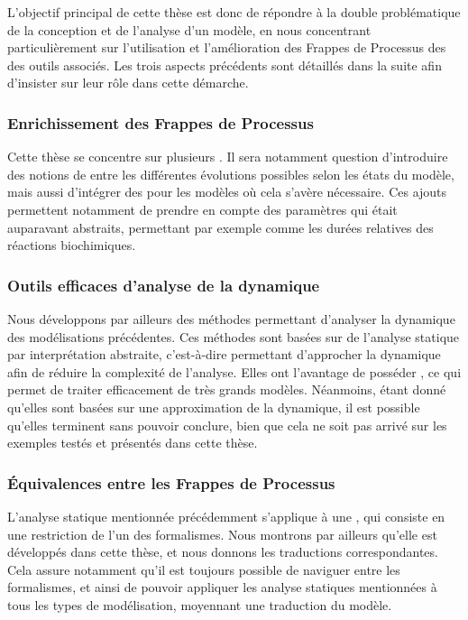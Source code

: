 L'objectif principal de cette thèse est donc de répondre à la double problématique
de la conception et de l'analyse d'un modèle,
en nous concentrant particulièrement sur l'utilisation et l'amélioration
des Frappes de Processus des des outils associés.
Les trois aspects précédents sont détaillés dans la suite
afin d'insister sur leur rôle dans cette démarche.

\subsubsection{Enrichissement des Frappes de Processus}

Cette thèse se concentre sur plusieurs .
Il sera notamment question d'introduire des notions de  entre les différentes
évolutions possibles selon les états du modèle, mais aussi d'intégrer
des  pour les modèles où cela s'avère nécessaire.
Ces ajouts permettent notamment de prendre en compte des paramètres qui était
auparavant abstraits,
permettant par exemple 
comme les durées relatives des réactions biochimiques.

\subsubsection{Outils efficaces d'analyse de la dynamique}

Nous développons par ailleurs des méthodes permettant d'analyser la dynamique
des modélisations précédentes.
Ces méthodes sont basées sur de l'analyse statique par interprétation abstraite,
c'est-à-dire permettant d'approcher la dynamique afin de réduire la complexité de l'analyse.
Elles ont l'avantage de posséder ,
ce qui permet de traiter efficacement de très grands modèles.
Néanmoins, étant donné qu'elles sont basées sur une approximation de la dynamique,
il est possible qu'elles terminent sans pouvoir conclure,
bien que cela ne soit pas arrivé sur les exemples testés et présentés dans cette thèse.

\subsubsection{Équivalences entre les Frappes de Processus}

L'analyse statique mentionnée précédemment s'applique à une ,
qui consiste en une restriction de l'un des formalismes.
Nous montrons par ailleurs qu'elle est  développés dans cette thèse,
et nous donnons les traductions correspondantes.
Cela assure notamment qu'il est toujours possible de naviguer entre les formalismes,
et ainsi de pouvoir appliquer les analyse statiques mentionnées à tous les types
de modélisation, moyennant une traduction du modèle.

